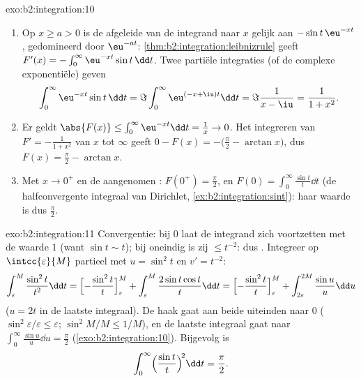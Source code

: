 \begin{solution}{exo:b2:integration:10}
\begin{enumerate}
  \item Op $x \geq a > 0$ is de afgeleide van de integrand naar $x$
        gelijk aan $-\sin t\,\eu^{-xt}$, gedomineerd door
        $\eu^{-at}$: \cref{thm:b2:integration:leibnizrule} geeft
        $F'(x) = -\int_0^\infty \eu^{-xt}\sin t\,\dd t$. Twee
        partiële integraties (of de complexe exponentiële) geven
        \[
        \int_0^\infty \eu^{-xt}\sin t\,\dd t
        = \Im \int_0^\infty \eu^{(-x+\iu)t}\dd t
        = \Im\frac{1}{x - \iu} = \frac{1}{1 + x^2} .
        \]
  \item Er geldt $\abs{F(x)} \leq \int_0^\infty \eu^{-xt}\dd t =
        \frac1x \to 0$. Het integreren van $F' = -\frac{1}{1+x^2}$
        van $x$ tot $\infty$ geeft $0 - F(x) = -\bigl(\frac\pi2 -
        \arctan x\bigr)$, dus $F(x) = \frac\pi2 - \arctan x$.
  \item Met $x \to 0^+$ en de aangenomen : $F(0^+) =
        \frac\pi2$, en $F(0) = \int_0^\infty \frac{\sin t}{t}\dd t$
        (de halfconvergente integraal van Dirichlet,
        \cref{ex:b2:integration:sint}): haar waarde is dus
        $\frac\pi2$.
\end{enumerate}
\end{solution}

\begin{solution}{exo:b2:integration:11}
Convergentie: bij $0$ laat de integrand zich  voortzetten
met de waarde $1$ (want $\sin t \sim t$); bij oneindig is zij $\leq
t^{-2}$: dus . Integreer op
$\intcc{\varepsilon}{M}$ partieel met $u = \sin^2 t$ en $v' =
t^{-2}$:
\[
\int_\varepsilon^M \frac{\sin^2 t}{t^2}\dd t
= \Bigl[-\frac{\sin^2 t}{t}\Bigr]_\varepsilon^M
+ \int_\varepsilon^M \frac{2\sin t\cos t}{t}\dd t
= \Bigl[-\frac{\sin^2 t}{t}\Bigr]_\varepsilon^M
+ \int_{2\varepsilon}^{2M} \frac{\sin u}{u}\dd u
\]
($u = 2t$ in de laatste integraal). De haak gaat aan beide
uiteinden naar $0$ ($\sin^2\varepsilon/\varepsilon \leq
\varepsilon$; $\sin^2 M/M \leq 1/M$), en de laatste integraal gaat
naar $\int_0^\infty \frac{\sin u}{u}\dd u = \frac\pi2$
(\cref{exo:b2:integration:10}). Bijgevolg is
\[
\int_0^\infty \Bigl(\frac{\sin t}{t}\Bigr)^{\!2}\dd t
= \frac\pi2 .
\]
\end{solution}

